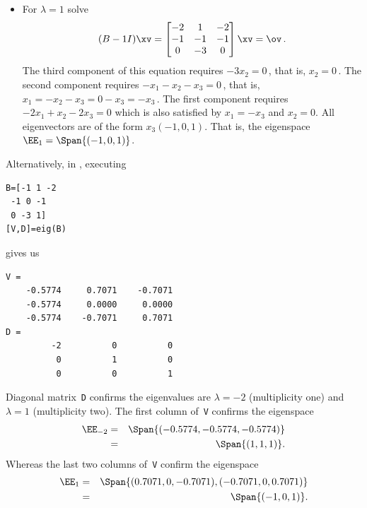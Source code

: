 \begin{example}
\begin{itemize}
\begin{solution}
\begin{itemize}
\item For \(\lambda=1\) solve
\begin{equation*}
(B-1I)\xv=\begin{bmatrix}-2&1&-2
\\-1&-1&-1
\\0&-3&0 \end{bmatrix}\xv=\ov\,.
\end{equation*}
The third component of this equation requires \(-3x_2=0\)\,, that is, \(x_2=0\)\,.
The second component requires \(-x_1-x_2-x_3=0\)\,, that is, \(x_1=-x_2-x_3=0-x_3=-x_3\)\,.
The first component requires \(-2x_1+x_2-2x_3=0\) which is also satisfied by \(x_1=-x_3\) and \(x_2=0\).
All eigenvectors are of the form \(x_3(-1,0,1)\).
That is, the eigenspace \(\EE_{1}=\Span\{(-1,0,1)\}\).
\end{itemize}

Alternatively, in \script, executing 
\begin{verbatim}
B=[-1 1 -2
 -1 0 -1
 0 -3 1]
[V,D]=eig(B)
\end{verbatim}
gives us
\begin{verbatim}
V =
    -0.5774     0.7071    -0.7071
    -0.5774     0.0000     0.0000
    -0.5774    -0.7071     0.7071
D =
         -2          0          0
          0          1          0
          0          0          1
\end{verbatim}
Diagonal matrix~\verb|D| confirms the eigenvalues are \(\lambda=-2\) (multiplicity one) and \(\lambda=1\) (multiplicity two). 
The first column of~\verb|V| confirms the eigenspace 
\begin{eqnarray*}
\EE_{-2}&=&\Span\{(-0.5774,-0.5774,-0.5774)\}
\\&=&\Span\{(1,1,1)\}.
\end{eqnarray*}
Whereas the last two columns of~\verb|V| confirm the eigenspace 
\begin{eqnarray*}
\EE_1&=&\Span\{(0.7071,0,-0.7071),(-0.7071,0,0.7071)\}
\\&=&\Span\{(-1,0,1)\}.
\end{eqnarray*}
\end{solution}


\end{itemize}
\end{example}
